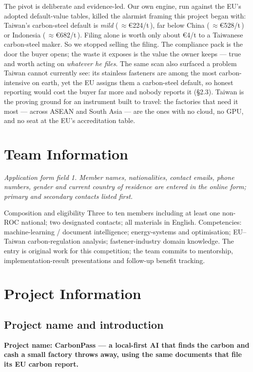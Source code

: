 \documentclass[11pt,a4paper]{article}
\begin{document}
The pivot is deliberate and evidence-led. Our own engine, run against the EU's adopted default-value tables, killed the alarmist framing this project began with: Taiwan's carbon-steel default is \emph{mild} (\,$\approx$€224/t\,), far below China (\,$\approx$€528/t\,) or Indonesia (\,$\approx$€682/t\,)\cite{ir2621,repo}. Filing alone is worth only about €4/t to a Taiwanese carbon-steel maker\cite{repo}. So we stopped selling the filing. The compliance pack is the door the buyer opens; the waste it exposes is the value the owner keeps --- true and worth acting on \emph{whatever he files}. The same scan also surfaced a problem Taiwan cannot currently see: its stainless fasteners are among the most carbon-intensive on earth, yet the EU assigns them a carbon-steel default, so honest reporting would cost the buyer far more and nobody reports it (\S2.3). Taiwan is the proving ground for an instrument built to travel: the factories that need it most --- across ASEAN and South Asia --- are the ones with no cloud, no GPU, and no seat at the EU's accreditation table.

\section{Team Information}\label{sec:team}
\emph{Application form field 1. Member names, nationalities, contact emails, phone numbers, gender and current country of residence are entered in the online form; primary and secondary contacts listed first.}
\begin{formfield}{Composition and eligibility}
Three to ten members including at least one non-ROC national; two designated contacts; all materials in English\cite{handbook}. Competencies: machine-learning / document intelligence; energy-systems and optimisation; EU--Taiwan carbon-regulation analysis; fastener-industry domain knowledge. The entry is original work for this competition; the team commits to mentorship, implementation-result presentations and follow-up benefit tracking.
\end{formfield}

\section{Project Information}\label{sec:project}

\subsection{Project name and introduction}
\textbf{Project name: CarbonPass --- a local-first AI that finds the carbon and cash a small factory throws away, using the same documents that file its EU carbon report.}
\end{document}

